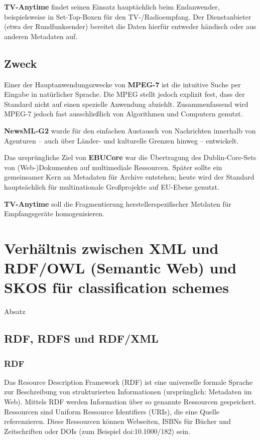 	\textbf{TV-Anytime} findet seinen Einsatz hauptächlich beim Endanwender, beispielsweise in Set-Top-Boxen für den TV-/Radioempfang. Der Dienstanbieter (etwa der Rundfunksender) bereitet die Daten hierfür entweder händisch oder aus anderen Metadaten auf.

	\subsection{Zweck}
	Einer der Hauptanwendungszwecke von \textbf{MPEG-7} ist die intuitive Suche per Eingabe in natürlicher Sprache. Die MPEG stellt jedoch explizit fest, dass der Standard nicht auf einen spezielle Anwendung abziehlt. Zusammenfassend wird MPEG-7 jedoch fast ausschließlich von Algorithmen und Computern genutzt.

	\textbf{NewsML-G2} wurde für den einfachen Austausch von Nachrichten innerhalb von Agenturen -- auch über Länder- und kulturelle Grenzen hinweg -- entwickelt. 
	
	Das ursprüngliche Ziel von \textbf{EBUCore} war die Übertragung des Dublin-Core-Sets von (Web-)Dokumenten auf multimediale Ressourcen. Später sollte ein gemeinsamer Kern an Metadaten für Archive entstehen; heute wird der Standard hauptsächlich für multinationale Großprojekte auf EU-Ebene genutzt. 
	
	\textbf{TV-Anytime} soll die Fragmentierung herstellerspezifischer Metdaten für Empfangsgeräte homogenisieren. 
	
	\section{Verhältnis zwischen XML und RDF/OWL (Semantic Web) und SKOS für classification schemes}
	Absatz

	\subsection{RDF, RDFS und RDF/XML}
	\subsubsection{RDF}
	Das Resource Description Framework (RDF) ist eine universelle formale Sprache zur Beschreibung von strukturierten Informationen (ursprünglich: Metadaten im Web). Mittels RDF werden Information über so genannte Ressourcen gespeichert. Ressourcen sind Uniform Ressource Identifiers (URIs), die eine Quelle referenzieren. Diese Ressourcen können Webseiten, ISBNs für Bücher und Zeitschriften oder DOIs (zum Beispiel doi:10.1000/182) sein.
	
